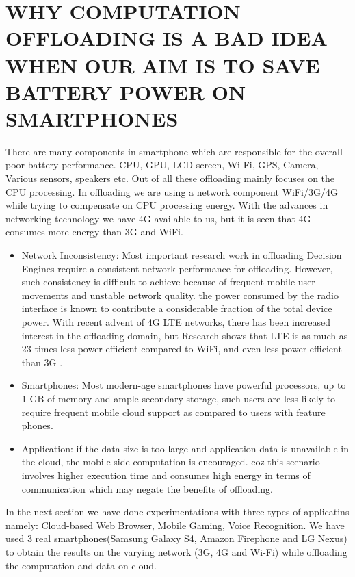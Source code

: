 \documentclass[12pt]{report}
\begin{document}
\chapter{WHY COMPUTATION OFFLOADING IS A BAD IDEA WHEN OUR AIM IS TO SAVE BATTERY POWER ON SMARTPHONES} %
\label{chap:Introduction}
There are many components in smartphone which are responsible for the overall poor battery performance. CPU, GPU, LCD screen, Wi-Fi, GPS, Camera, Various sensors, speakers etc. Out of all these offloading mainly focuses on the CPU processing. In offloading we are using a network component WiFi/3G/4G while trying to compensate on CPU processing energy. With the advances in networking technology we have 4G available to us, but it is seen that 4G consumes more energy than 3G and WiFi.
\begin{itemize}

\item Network Inconsistency: Most important research work in offloading Decision Engines require a consistent network performance for offloading. However, such consistency is difficult to achieve because of frequent mobile user movements and unstable network quality. the power consumed by the radio interface is known to contribute a considerable fraction of the total device power. 
With recent advent of 4G LTE networks, there has been increased interest in the offloading domain, but Research shows that LTE is as much as 23 times less power efficient compared to WiFi, and even less power efficient than 3G \cite{huang2012close}.

\item Smartphones: Most modern-age smartphones have powerful processors, up to 1 GB of memory and ample secondary storage, such users are less likely to require frequent mobile cloud support as compared to users with feature phones. 

\item Application: if the data size is too large and application data is unavailable in the cloud, the mobile side computation is encouraged. coz this scenario involves higher execution time and consumes high energy in terms of communication which may negate the benefits of offloading.
\end{itemize}

In the next section we have done experimentations with three types of applicatins namely: Cloud-based Web Browser, Mobile Gaming, Voice Recognition. We have used 3 real smartphones(Samsung Galaxy S4, Amazon Firephone and LG Nexus) to obtain the results on the varying network (3G, 4G and Wi-Fi) while offloading the computation and data on cloud.
\end{document}
